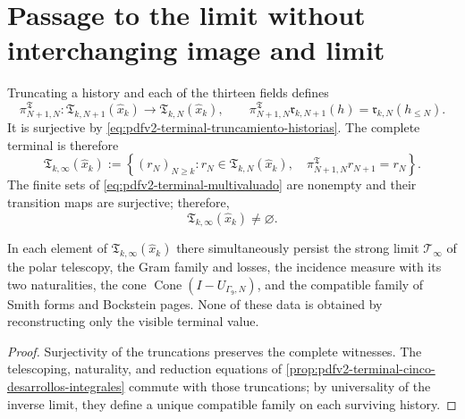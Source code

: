 \section{Passage to the limit without interchanging image and limit}

Truncating a history and each of the thirteen fields defines
\begin{equation}
\label{eq:pdfv2-terminal-transicion-horizonte}
 \pi^{\mathfrak T}_{N+1,N}:
 \mathfrak T_{k,N+1}(\widehat x_k)\longrightarrow
 \mathfrak T_{k,N}(\widehat x_k),
 \qquad
 \pi^{\mathfrak T}_{N+1,N}\mathfrak r_{k,N+1}(h)
 =\mathfrak r_{k,N}(h_{\leq N}).
\end{equation}
It is surjective by
\eqref{eq:pdfv2-terminal-truncamiento-historias}. The complete terminal is
therefore
\begin{equation}
\label{eq:pdfv2-terminal-limite-inverso}
 \mathfrak T_{k,\infty}(\widehat x_k)
 :=\left\{(r_N)_{N\geq k}:
 r_N\in\mathfrak T_{k,N}(\widehat x_k),\quad
 \pi^{\mathfrak T}_{N+1,N}r_{N+1}=r_N\right\}.
\end{equation}
The finite sets of
\eqref{eq:pdfv2-terminal-multivaluado} are nonempty and their transition maps
are surjective; therefore,
\begin{equation}
\label{eq:pdfv2-terminal-limite-no-vacio}
 \mathfrak T_{k,\infty}(\widehat x_k)\neq\varnothing.
\end{equation}

\begin{corollary}
\label{cor:pdfv2-terminal-limite-cinco-desarrollos}
In each element of
\(\mathfrak T_{k,\infty}(\widehat x_k)\) there simultaneously persist the strong
limit \(\mathcal T_\infty\) of the polar telescopy, the Gram family and
losses, the incidence measure with its two naturalities, the cone
\(\operatorname{Cone}(I-U_{\Gamma_9,N})\), and the compatible family of Smith forms and
Bockstein pages. None of these data is obtained
by reconstructing only the visible terminal value.
\end{corollary}

\begin{proof}
Surjectivity of the truncations preserves the complete witnesses. The
telescoping, naturality, and reduction equations of
\cref{prop:pdfv2-terminal-cinco-desarrollos-integrales} commute with those
truncations; by universality of the inverse limit, they define a unique compatible
family on each surviving history.
\end{proof}

